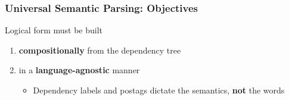 \documentclass[mathserif,12pt]{beamer}
\begin{document}
%

\begin{frame}
\frametitle{Universal Semantic Parsing: Objectives}
\large
Logical form must be built

\vspace{1em}
\begin{enumerate}
\item \textbf{compositionally} from the dependency tree 
  \vspace{2em}
\item in a \textbf{language-agnostic} manner
\begin{itemize}
  \item \large Dependency labels and postags dictate the semantics, \textbf{not} the words
\end{itemize}
\end{enumerate}



\end{frame}
\end{document}
